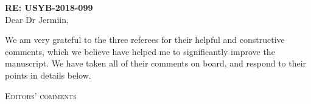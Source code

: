 \documentclass[12pt,letterpaper]{article}
\renewcommand{\section}[1]{%
\bigskip
\begin{center}
\begin{Large}
\normalfont\scshape #1
\medskip
\end{Large}
\end{center}}
\begin{document}
\textbf{RE: USYB-2018-099}\\
\bigskip
Dear Dr Jermiin,\\
\bigskip

We am very grateful to the three referees for their helpful and constructive comments, which we believe have helped me to significantly improve the manuscript.
We have taken all of their comments on board, and respond to their points in details below.


\section{Editors' comments}
\end{document}
